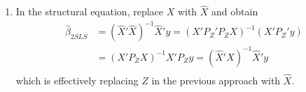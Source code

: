 \documentclass[12pt]{article}
\theoremstyle{definition}
\theoremstyle{property}
\newtheorem{property}{Property}[section]
\theoremstyle{assumption}
\theoremstyle{example}
\theoremstyle{comment}
\begin{document}
\begin{itemize}
\begin{enumerate}
\begin{mdframed}[backgroundcolor=green!5]
\begin{property}[Properties of Projection Matrix $P_Z$] Note the following 
\begin{itemize} 
\item Symmetric: $P_Z'=(Z(Z'Z)^{-1}Z')'=Z(Z'Z)^{-1}Z'=P_Z$
\item Idempotent: $P_Z^2=Z(Z'Z)^{-1}Z'Z(Z'Z)^{-1}Z'=Z(Z'Z)^{-1}Z'=P_Z$
\end{itemize}
\end{property}
\end{mdframed}
\item In the structural equation, replace $X$ with $\widehat{X}$ and obtain
\[
\begin{aligned}
\hat{\beta}_{2SLS}&=(\widehat{X}'\widehat{X})^{-1}\widehat{X}'y=(X'P_Z'P_ZX)^{-1}(X'P_Z'y)\\
&=(X'P_ZX)^{-1}X'P_Zy =(\widehat{X}'X)^{-1}\widehat{X}'y\\
\end{aligned}
\]
which is effectively replacing $Z$ in the previous approach with $\widehat{X}$. 
\end{enumerate}
\end{itemize}
\end{document}
